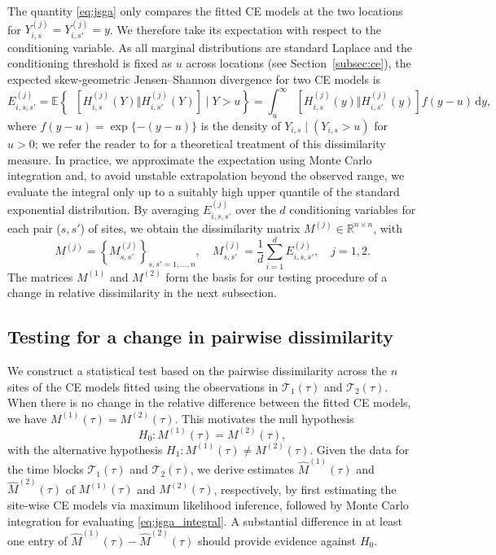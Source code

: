 \documentclass[APA,STIX1COL]{WileyNJD-v2}
\newcommand{\JSGa}{\mathop{\mathrm{JS}^{\mathrm{G}_{\lambda}}}\nolimits}
\begin{document}
The quantity \eqref{eq:jsga} only compares the fitted CE models at the two locations for $Y_{i,s}^{(j)} = Y_{i,s'}^{(j)} = y$. We therefore take its expectation with respect to the conditioning variable. As all marginal distributions are standard Laplace and the conditioning threshold is fixed as $u$ across locations (see Section~\ref{subsec:ce}), the expected skew-geometric Jensen--Shannon divergence for two CE models is
\begin{equation}
\label{eq:jsga_integral}
E_{i,s,s'}^{(j)} = 
\mathbb{E}
\left\{
\JSGa{}\left[H_{i,s}^{(j)}\left(Y\right) \Vert H_{i,s'}^{(j)}\left(Y\right)\right]
\mid Y>u
\right\}
=
\int_{u}^{\infty}
\JSGa{}\left[H_{i,s}^{(j)}(y) \Vert H_{i,s'}^{(j)}(y)\right]
f(y-u) \,\mathrm{d}y,
\end{equation}
where $f(y-u) = \exp\{-(y-u)\}$ is the density of $Y_{i,s}\mid (Y_{i,s}>u)$ for $u>0$; we refer the reader to \cite{OToole2026clustering} for a theoretical treatment of this dissimilarity measure. In practice, we approximate the expectation using Monte Carlo integration and, to avoid unstable extrapolation beyond the observed range, we evaluate the integral only up to a suitably high upper quantile of the standard exponential distribution. By averaging $E_{i,s,s'}^{(j)}$ over the $d$ conditioning variables for each pair ($s,s'$) of sites, we obtain the dissimilarity matrix $M^{(j)} \in \mathbb{R}^{n\times n}$, with
\begin{equation}
\label{eq:distance_matrix}
M^{(j)} =\left\{M_{s,s'}^{(j)}\right\}_{s,s'=1,\ldots,n}, \quad  
M_{s,s'}^{(j)} = 
\frac{1}{d} \sum_{i=1}^d E_{i,s,s'}^{(j)}
,\quad j=1,2.
\end{equation}
The matrices $M^{(1)}$ and $M^{(2)}$ form the basis for our testing procedure of a change in relative dissimilarity in the next subsection.

\subsection{Testing for a change in pairwise dissimilarity}
\label{subsec:cp}

We construct a statistical test based on the pairwise dissimilarity across the $n$ sites of the CE models fitted using the observations in $\mathcal{T}_1(\tau)$ and $\mathcal{T}_2(\tau)$. When there is no change in the relative difference between the fitted CE models, we have $M^{(1)}(\tau) = M^{(2)}(\tau)$. This motivates the null hypothesis
\begin{equation}
H_0: M^{(1)}(\tau) = M^{(2)}(\tau),
\label{eq:H0}
\end{equation}
with the alternative hypothesis $H_1: M^{(1)}(\tau) \neq M^{(2)}(\tau)$. Given the data for the time blocks $\mathcal{T}_1(\tau)$ and $\mathcal{T}_2(\tau)$, we derive estimates $\widehat{M}^{(1)}(\tau)$ and $\widehat{M}^{(2)}(\tau)$ of $M^{(1)}(\tau)$ and $M^{(2)}(\tau)$, respectively, by first estimating the site-wise CE models via maximum likelihood inference, followed by Monte Carlo integration for evaluating \eqref{eq:jsga_integral}. A substantial difference in at least one entry of $\widehat{M}^{(1)}(\tau) - \widehat{M}^{(2)}(\tau)$ should provide evidence against $H_0$.
\end{document}
